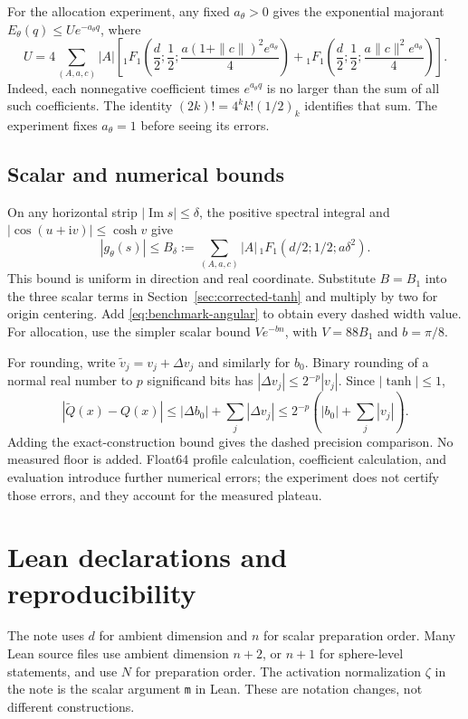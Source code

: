 \documentclass[11pt,letterpaper]{article}
\newcommand{\ii}{\mathrm i}
\theoremstyle{definition}
\theoremstyle{remark}
\begin{document}
For the allocation experiment, any fixed \(a_\theta>0\) gives the exponential
majorant \(E_\theta(q)\le U e^{-a_\theta q}\), where
\[
 U=4\sum_{(A,a,c)}|A|\left[
 {}_1F_1\!\left(\frac d2;\frac12;\frac{a(1+\|c\|)^2e^{a_\theta}}4\right)
 +{}_1F_1\!\left(\frac d2;\frac12;\frac{a\|c\|^2e^{a_\theta}}4\right)
 \right].
\]
Indeed, each nonnegative coefficient times \(e^{a_\theta q}\) is no larger
than the sum of all such coefficients. The identity
\((2k)!=4^k k!(1/2)_k\) identifies that sum. The experiment fixes
\(a_\theta=1\) before seeing its errors.

\subsection{Scalar and numerical bounds}
On any horizontal strip \(|\operatorname{Im}s|\le\delta\), the positive
spectral integral and \(|\cos(u+\ii v)|\le\cosh v\) give
\[
 |g_\theta(s)|\le
 B_\delta:=\sum_{(A,a,c)}|A|\,{}_1F_1(d/2;1/2;a\delta^2).
\]
This bound is uniform in direction and real coordinate. Substitute
\(B=B_1\) into the three scalar terms in
Section~\ref{sec:corrected-tanh} and multiply by two for origin centering.
Add \eqref{eq:benchmark-angular} to obtain every dashed width value.
For allocation, use the simpler scalar bound
\(V e^{-bn}\), with \(V=88B_1\) and \(b=\pi/8\).

For rounding, write \(\widetilde v_j=v_j+\Delta v_j\) and similarly for
\(b_0\). Binary rounding of a normal real number to \(p\) significand bits
has \(|\Delta v_j|\le2^{-p}|v_j|\). Since \(|\tanh|\le1\),
\[
 |\widetilde Q(x)-Q(x)|
 \le |\Delta b_0|+\sum_j|\Delta v_j|
 \le2^{-p}\left(|b_0|+\sum_j|v_j|\right).
\]
Adding the exact-construction bound gives the dashed precision comparison.
No measured floor is added. Float64 profile calculation, coefficient calculation,
and evaluation introduce further numerical errors; the experiment does not
certify those errors, and they account for the measured plateau.
\section{Lean declarations and reproducibility}\label{app:lean}
The note uses \(d\) for ambient dimension and \(n\) for scalar preparation
order. Many Lean source files use ambient dimension \(n+2\), or \(n+1\) for
sphere-level statements, and use \(N\) for preparation order.
The activation normalization \(\zeta\) in the note is the scalar argument
\texttt{m} in Lean. These are notation changes, not different constructions.
\end{document}
